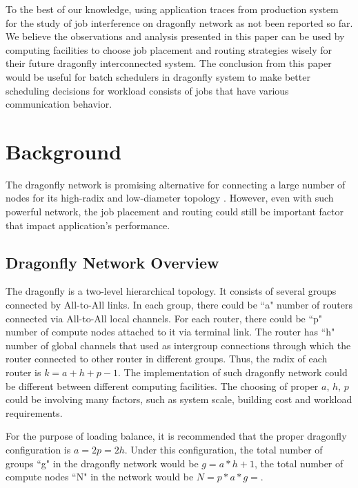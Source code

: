 \documentclass[conference,compsoc]{IEEEtran}
\begin{document}
To the best of our knowledge, using application traces from production system for the study of job interference on dragonfly network as not been reported so far. We believe the observations and analysis presented in this paper can be used by computing facilities to choose job placement and routing strategies wisely for their future dragonfly interconnected system. The conclusion from this paper would be useful for batch schedulers in dragonfly system to make better scheduling decisions for workload consists of jobs that have various communication behavior.

\section{Background}
\label{sec:background}
The dragonfly network is promising alternative for connecting a large number of nodes for its high-radix and low-diameter topology\cite{dally-dragonfly} \cite{kim-micro} \cite{faanes}. However, even with such powerful network, the job placement and routing could still be important factor that impact application's performance. 


\subsection{Dragonfly Network Overview}
\label{sec:network}
The dragonfly is a two-level hierarchical topology. It consists of several groups connected by All-to-All links. In each group, there could be ``a" number of routers connected via All-to-All local channels. For each router, there could be ``p" number of compute nodes attached to it via terminal link. The router has ``h" number of global channels that used as intergroup connections through which the router connected to other router in different groups. Thus, the radix of each router is $k = a+h+p-1$. The implementation of such dragonfly network could be different between different computing facilities. The choosing of proper $a$, $h$, $p$ could be involving many factors, such as system scale, building cost and workload requirements. 

For the purpose of loading balance, it is recommended that the proper dragonfly configuration is $a=2p=2h$\cite{kim-micro}. Under this configuration, the total number of groups ``g" in the dragonfly network would be $g = a*h+1 $, the total number of compute nodes ``N" in the network would be $N = p*a*g = $.
\end{document}
